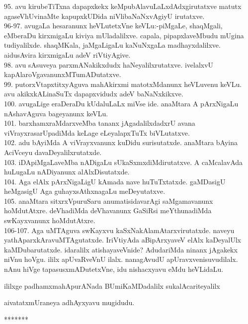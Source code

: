 \documentclass{article}
\begin{document}
95. avu kirubeTiTxna dapapxkekx keMpubAlavuLaLxdAdxgirutatxve matutx agaseVhUvinaMte kapupxkUDida niVlibaNaNxvAgiyU irutatxve.\\
96-97. avugaLa hesaranunx heVLutetxVne keVLu:-piMgaLe, shaqMgali, eMberaDu kirxmigaLu kiviya mUladalilxve. capala, pipapxlaveMbudu mUgina tudiyalilxde. shaqMKala, jaMgaLigaLu kaNuNxgaLa madhayxdalilxve. aidusAvira kirxmigaLu adeV riVtiyAgive.\\
98. avu sAsuveya parxmANakikxdudx haNeyalilxrutatxve. ivelalxvU kapAlaroVgavanunxMTumADutatxve.\\
99. putorxVtapxtitxyAguva mahAkirxmi matotxMdanunx heVLuvenu keVLu. avu akikxkALinaSuTx dapapxvidudx adeV baNaNxkikxve.\\
100. avugaLige eraDeraDu kUdaluLaLx miVse ide. anaMtara A pArxNigaLu nAshavAguva bageyanunx keVLu.\\
101. barxhamxraMdarxveMba tananx jAgadalilxdadxrU avana viVrayxrasarUpadiMda keLage eLeyalapxTuTx biVLutatxve.\\
102. adu bAyiMda A viVrayxvanunx kuDidu surisutatxde. anaMtara bAyina AciVceyu davaDeyalilxrutatxde.\\
103. iDApiMgaLaveMba nADigaLu sUkaSxmxdiMdirutatxve. A caMcalavAda huLugaLu nADiyanunx alAlxDisutatxde.\\
104. Aga elAlx pArxNigaLigU kAmada nave huTuTxtatxde. gaMDasigU heMgasigU Aga guhayxsAthxnagaLu meDeyutatxve.\\
105. anaMtara sitxrxVpuruSaru anumatisidavarAgi saMgamavanunx hoMdutAtxre. deVhadiMda deVhavanunx GaSiRsi meYthunadiMda swKayxvanunx hoMdutAtxre.\\
106-107. Aga uMTAguva swKayxvu kaSxNakAlamAtarxvirutatxde. naveyu yathAparxkAravuMTAgutatxde. IriVtiyAda aBipArxyaveV elAlx kaDeyalUlx kaMDubarutatxde. idaralilx atishayaveVnide? AdudariMda ninanx jAgakekx niVnu hoVgu. ililx apUvaRveVnU ilalx. nanagAvudU apUravxvenisuvudilalx. nAnu hiVge tapasusxmADutetxVne, idu nishacxyavu eMdu heVLidaLu.\\

\begin{center}
ililxge padhamxmahApurANada BUmiKaMDadalilx sukalAcariteyalilx
\end{center}

\begin{center}
aivatatxmUraneya adhAyxyavu mugidudu.
\end{center}

\begin{center}
*******
\end{center}
\end{document}
